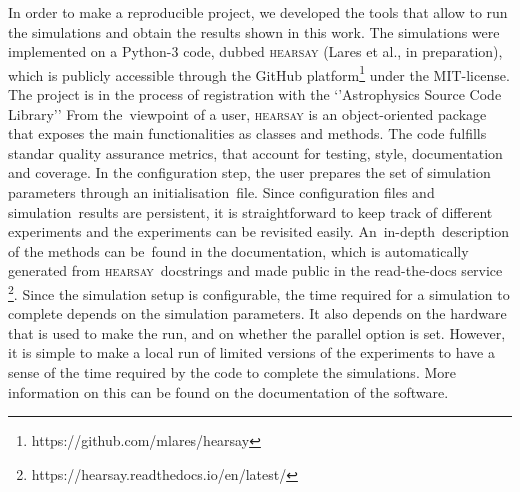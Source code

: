 \documentclass[crop]{CSLB}
\newcommand{\hs}{\textsc{hearsay}}
\begin{document}
%
In order to make a reproducible project, we developed the tools
that allow to run the simulations and obtain the results shown in this work.
%
The simulations were implemented on a Python-3 code, dubbed \hs{} (Lares et al., in preparation),
which is publicly accessible through the GitHub
platform\footnote{https://github.com/mlares/hearsay} under the
MIT-license.
%
The project is in the process of registration with the ‘’Astrophysics
Source Code Library’’ \citep[ASCL, ][]{2015JORS....3E..15A,
2020ASPC..522..731A}
%
From the viewpoint of a user, \hs{} is an object-oriented package that
exposes the main functionalities as classes and methods.
%
The code fulfills standar quality assurance metrics, that account for
testing, style, documentation and coverage.
%
In the configuration step, the user prepares the set of simulation
parameters through an initialisation file.
%
Since configuration files and simulation results are persistent, it is
straightforward to keep track of different experiments and the
experiments can be revisited easily.
%
An in-depth description of the methods can be found in the
documentation, which is automatically generated from \hs{} docstrings
and made public in the read-the-docs service
\footnote{https://hearsay.readthedocs.io/en/latest/}.
%
Since the simulation setup is configurable, the time required for a simulation
to complete depends on the simulation parameters.
%
It also depends on the hardware that is used to make the run, and on whether
the parallel option is set.
%
However, it is simple to make a local run of limited versions of the
experiments to have a sense of the time required by the code to complete the
simulations.
%
More information on this can be found on the documentation of the software.
\end{document}

